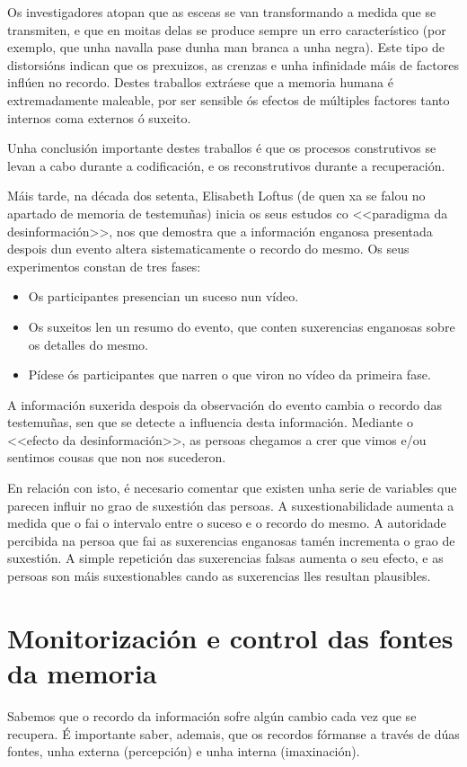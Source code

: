 \documentclass[a4paper,11pt]{article}
\begin{document}
\begin{itemize}
	Os investigadores atopan que as esceas se van transformando a medida que se transmiten, e que en
	moitas delas se produce sempre un erro característico (por exemplo, que unha navalla pase dunha
	man branca a unha negra). Este tipo de distorsións indican que os prexuizos, as crenzas e unha
	infinidade máis de factores inflúen no recordo. Destes traballos extráese que a memoria humana é
	extremadamente maleable, por ser sensible ós efectos de múltiples factores tanto internos coma
	externos ó suxeito.
\end{itemize}

Unha conclusión importante destes traballos é que os procesos construtivos se levan a cabo durante a codificación, e os reconstrutivos durante a recuperación.

Máis tarde, na década dos setenta, Elisabeth Loftus (de quen xa se falou no apartado de memoria de testemuñas) inicia os seus estudos co <<paradigma da desinformación>>, nos que demostra que a información enganosa presentada despois dun evento altera sistematicamente o recordo do mesmo. Os seus experimentos constan de tres fases:
\begin{itemize}
	\item Os participantes presencian un suceso nun vídeo.
	\item Os suxeitos len un resumo do evento, que conten suxerencias enganosas sobre os detalles do
	mesmo.
	\item Pídese ós participantes que narren o que viron no vídeo da primeira fase. 
\end{itemize}

A información suxerida despois da observación do evento cambia o recordo das testemuñas, sen que se detecte a influencia desta información. Mediante o <<efecto da desinformación>>, as persoas chegamos a crer que vimos e/ou sentimos cousas que non nos sucederon. 

En relación con isto, é necesario comentar que existen unha serie de variables que parecen influir no grao de suxestión das persoas. A suxestionabilidade aumenta a medida que o fai o intervalo entre
o suceso e o recordo do mesmo. A autoridade percibida na persoa que fai as suxerencias enganosas tamén incrementa o grao de suxestión. A simple repetición das suxerencias falsas aumenta o seu efecto, e as persoas son máis suxestionables cando as suxerencias lles resultan plausibles.

\section{Monitorización e control das fontes da memoria}
Sabemos que o recordo da información sofre algún cambio cada vez que se recupera. É importante saber, ademais, que os recordos fórmanse a través de dúas fontes, unha externa (percepción) e unha interna (imaxinación).
\end{document}
